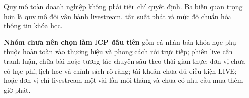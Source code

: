 Quy mô toàn doanh nghiệp không phải tiêu chí quyết định. Ba biến quan trọng hơn
là quy mô đội vận hành livestream, tần suất phát và mức độ chuẩn hóa thông tin
khóa học.

\textbf{Nhóm chưa nên chọn làm ICP đầu tiên} gồm cá nhân bán khóa học phụ thuộc
hoàn toàn vào thương hiệu và phong cách nói trực tiếp; phiên live cần tranh luận,
chữa bài hoặc tương tác chuyên sâu theo thời gian thực; đơn vị chưa có học phí,
lịch học và chính sách rõ ràng; tài khoản chưa đủ điều kiện LIVE; hoặc đơn vị chỉ
livestream một vài lần mỗi tháng và chưa có nhu cầu mua thêm giờ phát.
